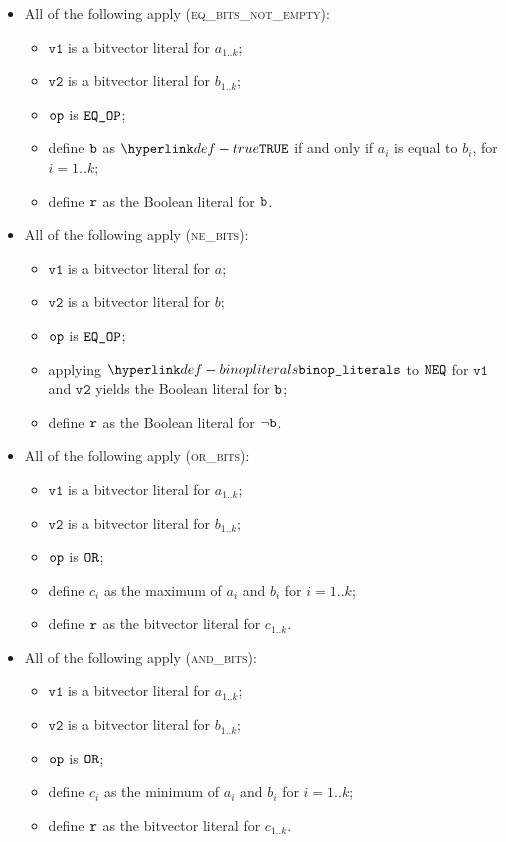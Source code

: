 \documentclass{book}
\newcommand\ProseOrTypeError[0]{\ProseTerminateAs{\TypeErrorConfig}}
\newcommand\vvone[0]{\texttt{v1}}
\newcommand\vvtwo[0]{\texttt{v2}}
\begin{document}
\begin{itemize}
  \item All of the following apply (\textsc{eq\_bits\_not\_empty}):
  \begin{itemize}
    \item $\vvone$ is a bitvector literal for $a_{1..k}$;
    \item $\vvtwo$ is a bitvector literal for $b_{1..k}$;
    \item $\texttt{op}$ is $\texttt{EQ\_OP}$;
    \item define $\texttt{b}$ as $\True$ if and only if $a_i$ is equal to $b_i$, for $i=1..k$;
    \item define $\texttt{r}$ as the Boolean literal for $\texttt{b}$.
  \end{itemize}

  \item All of the following apply (\textsc{ne\_bits}):
  \begin{itemize}
    \item $\vvone$ is a bitvector literal for $a$;
    \item $\vvtwo$ is a bitvector literal for $b$;
    \item $\texttt{op}$ is $\texttt{EQ\_OP}$;
    \item applying $\binopliterals$ to $\texttt{NEQ}$ for $\vvone$ and $\vvtwo$ yields the Boolean literal for $\texttt{b}$\ProseOrTypeError;
    \item define $\texttt{r}$ as the Boolean literal for $\neg\texttt{b}$.
  \end{itemize}

  \item All of the following apply (\textsc{or\_bits}):
  \begin{itemize}
    \item $\vvone$ is a bitvector literal for $a_{1..k}$;
    \item $\vvtwo$ is a bitvector literal for $b_{1..k}$;
    \item $\texttt{op}$ is $\texttt{OR}$;
    \item define $c_i$ as the maximum of $a_i$ and $b_i$ for $i=1..k$;
    \item define $\texttt{r}$ as the bitvector literal for $c_{1..k}$.
  \end{itemize}

  \item All of the following apply (\textsc{and\_bits}):
  \begin{itemize}
    \item $\vvone$ is a bitvector literal for $a_{1..k}$;
    \item $\vvtwo$ is a bitvector literal for $b_{1..k}$;
    \item $\texttt{op}$ is $\texttt{OR}$;
    \item define $c_i$ as the minimum of $a_i$ and $b_i$ for $i=1..k$;
    \item define $\texttt{r}$ as the bitvector literal for $c_{1..k}$.
  \end{itemize}


\end{itemize}
\end{document}
